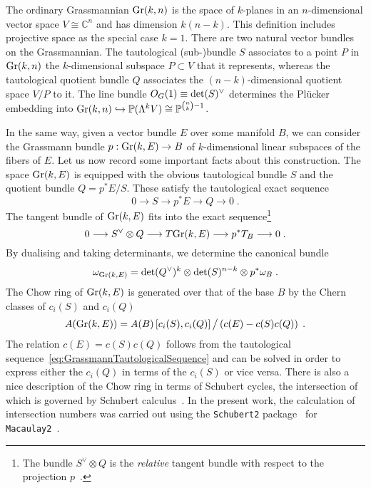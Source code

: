 \documentclass[11pt,a4paper]{article}
\numberwithin{equation}{section}
\numberwithin{table}{section}\setlength{\multlinegap}{25pt}
\begin{document}
The ordinary Grassmannian $\textup{Gr}(k,n)$ is the space of $k$-planes in an $n$-dimensional vector space $V\cong \mathbb{C}^n$ and has dimension $k(n-k)$. This definition includes projective space as the special case $k=1$. There are two natural vector bundles on the Grassmannian. The tautological (sub-)bundle $S$ associates to a point $P$ in $\textup{Gr}(k,n)$ the $k$-dimensional subspace $P\subset V$ that it represents, whereas the tautological quotient bundle $Q$ associates the $(n-k)$-dimensional quotient space $V/P$ to it. The line bundle $O_G(1)\equiv \textup{det}(S)^\vee$ determines the Plücker embedding into $\textup{Gr}(k,n)\hookrightarrow \mathbb{P}(\Lambda^k V)\cong\mathbb{P}^{\binom{n}{k}-1}$.

In the same way, given a vector bundle $E$ over some manifold $B$, we can consider the Grassmann bundle $p:\textup{Gr}(k,E)\to B$ of $k$-dimensional linear subspaces of the fibers of $E$. Let us now record some important facts about this construction. The space $\textup{Gr}(k,E)$ is equipped with the obvious tautological bundle $S$ and the quotient bundle $Q=p^*E/S$. These satisfy the tautological exact sequence
\begin{equation}
    \label{eq:GrassmannTautologicalSequence}
    0\longrightarrow S\longrightarrow p^* E\longrightarrow Q\longrightarrow 0\;.
\end{equation}
The tangent bundle of $\textup{Gr}(k,E)$ fits into the exact sequence\footnote{The bundle $S^\vee \otimes Q$ is the \emph{relative} tangent bundle with respect to the projection $p$~\cite{fulton2016intersection}.}
\begin{equation}
    0\longrightarrow S^\vee \otimes Q\longrightarrow T\textup{Gr}(k,E)\longrightarrow p^* T_B\longrightarrow 0\;.
\end{equation}
By dualising and taking determinants, we determine the canonical bundle
\begin{equation}
    \omega_{\textup{Gr}(k,E)}=\textup{det}(Q^\vee)^k\otimes \textup{det}(S)^{n-k}\otimes p^*\omega_B\;.
\end{equation}
The Chow ring of $\textup{Gr}(k,E)$ is generated over that of the base $B$ by the Chern classes of $c_i(S)$ and $c_i(Q)$
\begin{equation}
    A(\textup{Gr}(k,E))=A(B)\left[c_i(S),c_i(Q)\right]\big/ \left(c(E)-c(S)c(Q)\right)\;.
\end{equation}
The relation $c(E)=c(S)c(Q)$ follows from the tautological sequence~\eqref{eq:GrassmannTautologicalSequence} and can be solved in order to express either the $c_i(Q)$ in terms of the $c_i(S)$ or vice versa. There is also a nice description of the Chow ring in terms of Schubert cycles, the intersection of which is governed by Schubert calculus~\cite{eisenbud_harris_2016}. In the present work, the calculation of intersection numbers was carried out using the \texttt{Schubert2} package~\cite{Schubert2Source} for \texttt{Macaulay2}~\cite{M2}.
\end{document}
